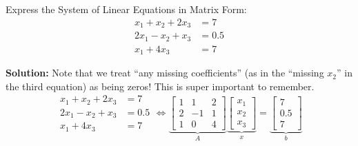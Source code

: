 \documentclass[letterpaper]{book}
\begin{document}
\begin{example}
\label{ex:ExpressMatrixForm03}
Express the System of Linear Equations in Matrix Form: 
\begin{equation}
\begin{aligned}
x_1+x_2+2x_3 &=7 \\
2x_1-x_2+x_3&=0.5\\
x_1 + 4 x_3 &=7
\end{aligned}
\end{equation}
\end{example}

\textbf{Solution:} Note that we treat ``any missing coefficients'' (as in the ``missing $x_2$'' in the third equation) as being zeros! This is super important to remember. 
\begin{equation}
\label{eq:Axeqb04}
\begin{aligned}
x_1+x_2+2x_3 &=7 \\
2x_1-x_2+x_3&=0.5\\
x_1 + 4 x_3 &=7
\end{aligned}
\iff \underbrace{\left[\begin{array}{rrr} 1 & 1 & 2\\
2 & -1 & 1 \\ 1 & \boxed{0} & 4\end{array}\right]}_{A} \underbrace{\left[\begin{array}{c} x_1\\ x_2 \\ x_3\end{array}\right]}_{x} =   \underbrace{\left[\begin{array}{c} 7\\ 0.5 \\ 7\end{array}\right]}_{b}
\end{equation}
\Qed
\end{document}

